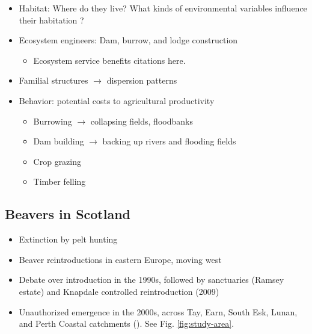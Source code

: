 \begin{itemize}
    \item Habitat: Where do they live? What kinds of environmental variables influence their habitation \parencite{swinnen_environmental_2019}?
    \item Ecosystem engineers: Dam, burrow, and lodge construction
    \begin{itemize}
        \item Ecosystem service benefits citations here.
    \end{itemize}
    \item Familial structures $\rightarrow$ dispersion patterns
    \item Behavior: potential costs to agricultural productivity
    \begin{itemize}
        \item Burrowing $\rightarrow$ collapsing fields, floodbanks
        \item Dam building $\rightarrow$ backing up rivers and flooding fields
        \item Crop grazing
        \item Timber felling
    \end{itemize}
\end{itemize}

\subsection{Beavers in Scotland}

\begin{itemize}
    \item Extinction by pelt hunting
    \item Beaver reintroductions in eastern Europe, moving west
    \item Debate over introduction in the 1990s, followed by sanctuaries (Ramsey estate) and Knapdale controlled reintroduction (2009)
    \item Unauthorized emergence in the 2000s, across Tay, Earn, South Esk, Lunan, and Perth Coastal catchments (\cite{noauthor_beavers_2017}). See Fig. \ref{fig:study-area}. 
\end{itemize}

